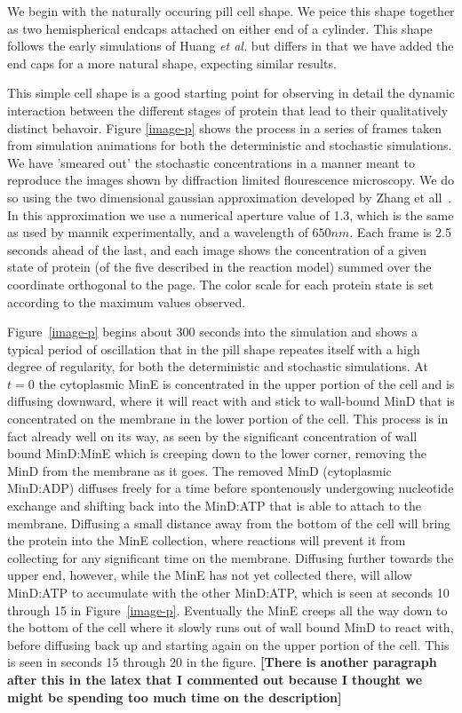 \documentclass[letterpaper,twocolumn,amsmath,amssymb,pre]{revtex4-1}
\newcommand{\red}[1]{{\bf \color{red} #1}}
\newcommand{\fixme}[1]{\red{[#1]}}
\begin{document}
We begin with the naturally occuring pill cell shape.  We peice this
shape together as two hemispherical endcaps attached on either end of
a cylinder.  This shape follows the early simulations of Huang
\emph{et al.} but differs in that we have added the end caps for a
more natural shape, expecting similar results.

This simple cell shape is a good starting point for observing in
detail the dynamic interaction between the different stages of protein
that lead to their qualitatively distinct behavoir. Figure
\ref{image-p} shows the process in a series of frames taken from
simulation animations for both the deterministic and stochastic
simulations.  We have 'smeared out' the stochastic concentrations in a
manner meant to reproduce the images shown by diffraction limited
flourescence microscopy.  We do so using the two dimensional gaussian
approximation developed by Zhang et all~\cite{zhang2007gaussian}.  In
this approximation we use a numerical aperture value of 1.3, which is
the same as used by mannik experimentally, and a wavelength of
$650nm$.  Each frame is 2.5 seconds ahead of the last, and each image
shows the concentration of a given state of protein (of the five
described in the reaction model) summed over the coordinate orthogonal
to the page.  The color scale for each protein state is set according
to the maximum values observed.

Figure~\ref{image-p} begins about 300 seconds into the simulation and
shows a typical period of oscillation that in the pill shape repeates
itself with a high degree of regularity, for both the deterministic
and stochastic simulations.  At $t=0$ the cytoplasmic MinE is
concentrated in the upper portion of the cell and is diffusing
downward, where it will react with and stick to wall-bound MinD that
is concentrated on the membrane in the lower portion of the cell.
This process is in fact already well on its way, as seen by the
significant concentration of wall bound MinD:MinE which is creeping
down to the lower corner, removing the MinD from the membrane as it
goes.  The removed MinD (cytoplasmic MinD:ADP) diffuses freely for a
time before spontenously undergowing nucleotide exchange and shifting
back into the MinD:ATP that is able to attach to the membrane.
Diffusing a small distance away from the bottom of the cell will bring
the protein into the MinE collection, where reactions will prevent it
from collecting for any significant time on the membrane.  Diffusing
further towards the upper end, however, while the MinE has not yet
collected there, will allow MinD:ATP to accumulate with the other
MinD:ATP, which is seen at seconds 10 through 15 in
Figure~\ref{image-p}.  Eventually the MinE creeps all the way down to
the bottom of the cell where it slowly runs out of wall bound MinD to
react with, before diffusing back up and starting again on the upper
portion of the cell. This is seen in seconds 15 through 20 in the
figure.  \fixme{There is another paragraph after this in the latex
  that I commented out because I thought we might be spending too much
  time on the description}
\end{document}
